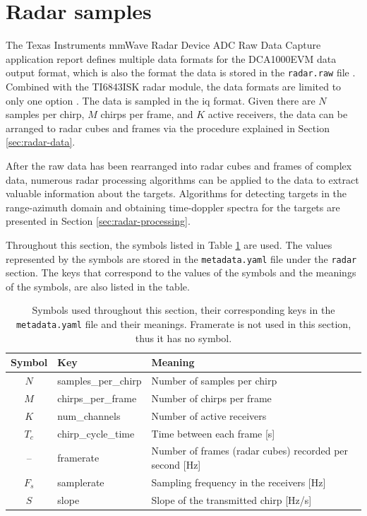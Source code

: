 \section{Radar samples}
\label{sec:radar-file}
The Texas Instruments mmWave Radar Device ADC Raw Data Capture application report defines multiple data formats for the DCA1000EVM data output format,
which is also the format the data is stored in the \texttt{radar.raw} file \cite{dca1000-raw-data-capture}.
Combined with the TI6843ISK radar module, the data formats are limited to only one option \cite{mmwave-sdk-user-guide}.
The data is sampled in the \gls{iq} format.
Given there are $N$ samples per chirp, $M$ chirps per frame, and $K$ active receivers,
the data can be arranged to radar cubes and frames via the procedure explained in Section \ref{sec:radar-data}.

After the raw data has been rearranged into radar cubes and frames of complex data,
numerous radar processing algorithms can be applied to the data to extract valuable information about the targets.
Algorithms for detecting targets in the range-azimuth domain and obtaining time-doppler spectra for the targets are presented in Section \ref{sec:radar-processing}.

Throughout this section, the symbols listed in Table \ref{tab:radar-symbols} are used.
The values represented by the symbols are stored in the \texttt{metadata.yaml} file
under the \texttt{radar} section.
The keys that correspond to the values of the symbols and the meanings of the symbols, are also listed in the table.

\begin{table}[h]
    \centering
    \begin{tabular}{c l p{3in}}
    \toprule
        \textbf{Symbol} & \textbf{Key} & \textbf{Meaning} \\
    \midrule
         $N$ & samples\_per\_chirp & Number of samples per chirp \\
         $M$ & chirps\_per\_frame & Number of chirps per frame \\
         $K$ & num\_channels & Number of active receivers \\
         $T_c$ & chirp\_cycle\_time & Time between each frame [s] \\
         -- & framerate & Number of frames (radar cubes) recorded per second [Hz] \\
         $F_s$ & samplerate & Sampling frequency in the receivers [Hz] \\
         $S$ & slope & Slope of the transmitted chirp [Hz/s] \\
    \bottomrule
    \end{tabular}
    \caption{
        Symbols used throughout this section, their corresponding keys in the \texttt{metadata.yaml} file and their meanings.
        Framerate is not used in this section, thus it has no symbol.
    }
    \label{tab:radar-symbols}
\end{table}

